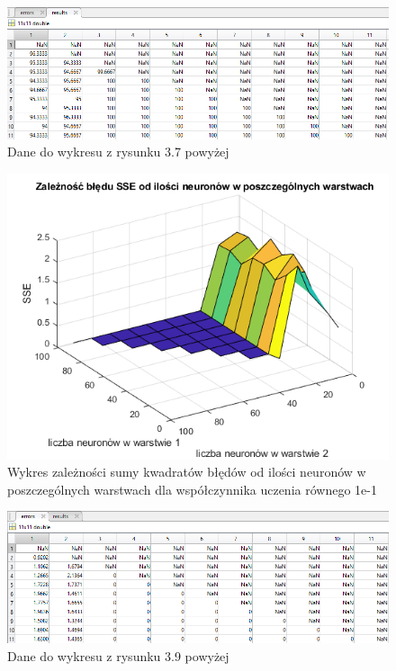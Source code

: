 \documentclass[a4paper, 12pt]{article}
\begin{document}
\begin{figure}[ht]
	\centering
	\includegraphics[width=12cm]{images/lr1 pk dane}
	\caption{Dane do wykresu z rysunku 3.7 powyżej}
\label{Fig:lr1 pk dane}
\end{figure}

\clearpage

\begin{figure}[ht]
	\centering
	\includegraphics[width=12cm]{images/lr1 sse}
	\caption{Wykres zależności sumy kwadratów błędów od ilości neuronów w poszczególnych warstwach dla współczynnika uczenia równego 1e-1}
\label{Fig:lr1 sse}
\end{figure}

\begin{figure}[ht]
	\centering
	\includegraphics[width=12cm]{images/lr1 sse dane}
	\caption{Dane do wykresu z rysunku 3.9 powyżej}
\label{Fig:lr1 sse dane}
\end{figure}
\end{document}
